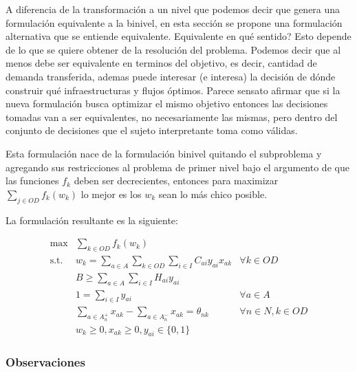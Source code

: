 \documentclass{article}
\begin{document}
  A diferencia de la transformación a un nivel que podemos decir que genera una formulación equivalente a la binivel, en esta sección se propone una formulación alternativa que se entiende equivalente. Equivalente en qué sentido? Esto depende de lo que se quiere obtener de la resolución del problema. Podemos decir que al menos debe ser equivalente en terminos del objetivo, es decir, cantidad de demanda transferida, ademas puede interesar (e interesa) la decisión de dónde construir qué infraestructuras y flujos óptimos. Parece sensato afirmar que si la nueva formulación busca optimizar el mismo objetivo entonces las decisiones tomadas van a ser equivalentes, no necesariamente las mismas, pero dentro del conjunto de decisiones que el sujeto interpretante toma como válidas.

  Esta formulación nace de la formulación binivel quitando el subproblema y agregando sus restricciones al problema de primer nivel bajo el argumento de que las funciones $f_k$ deben ser decrecientes, entonces para maximizar $\sum_{j \in OD}f_k(w_k)$ lo mejor es los $w_k$ sean lo más chico posible.

  La formulación resultante es la siguiente:

  \begin{align}
    \text{max}    & \sum_{k \in OD} f_k(w_k)                                                         & \label{eq:objectivealt} \\
    \text{s.t.}\; & w_k = \sum_{a \in A} \sum_{k \in OD} \sum_{i \in I} C_{ai}y_{ai}x_{ak}           & \forall k \in OD \label{eq:shortestpathalt} \\
                  & B \geq \sum_{a \in A} \sum_{i \in I} H_{ai}y_{ai}                                & \label{eq:respectbudgetalt} \\
                  & 1 = \sum_{i \in I} y_{ai}                                                        & \forall a \in A \label{eq:alwaysoneyalt} \\
                  & \sum_{a \in A_n^+} x_{ak} - \sum_{a \in A_n^-} x_{ak} = \theta_{nk}              & \forall n \in N, k \in OD \label{eq:flowbalancealt} \\
                  & w_k \geq 0, x_{ak} \geq 0, y_{ai} \in \{0,1\}                                    & \nonumber
  \end{align}

  \subsubsection*{Observaciones}
\end{document}
